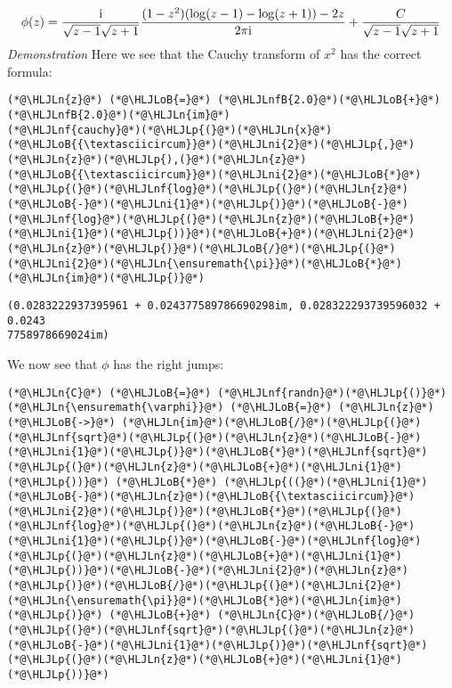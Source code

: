 \documentclass[12pt,landscape]{article}
\newcommand{\HLJLn}[1]{#1}
\newcommand{\HLJLnf}[1]{\textcolor[RGB]{66,102,213}{#1}}
\newcommand{\HLJLnfB}[1]{\textcolor[RGB]{59,151,46}{#1}}
\newcommand{\HLJLni}[1]{\textcolor[RGB]{59,151,46}{#1}}
\newcommand{\HLJLoB}[1]{\textcolor[RGB]{102,102,102}{\textbf{#1}}}
\newcommand{\HLJLp}[1]{#1}
\def\I{ {\rm i} }
\begin{document}
{\[
\phi(z) = {\I \over \sqrt{z - 1} \sqrt{z+1}} {(1-z^2)(\log(z-1) - \log(z+1)) - 2 z \over 2 \pi \I}  + {C \over \sqrt{z-1}\sqrt{z+1}}
\]
\emph{Demonstration} Here we see that the Cauchy transform of $x^2$ has the correct formula:


\begin{lstlisting}
(*@\HLJLn{z}@*) (*@\HLJLoB{=}@*) (*@\HLJLnfB{2.0}@*)(*@\HLJLoB{+}@*)(*@\HLJLnfB{2.0}@*)(*@\HLJLn{im}@*)
(*@\HLJLnf{cauchy}@*)(*@\HLJLp{(}@*)(*@\HLJLn{x}@*)(*@\HLJLoB{{\textasciicircum}}@*)(*@\HLJLni{2}@*)(*@\HLJLp{,}@*) (*@\HLJLn{z}@*)(*@\HLJLp{),(}@*)(*@\HLJLn{z}@*)(*@\HLJLoB{{\textasciicircum}}@*)(*@\HLJLni{2}@*)(*@\HLJLoB{*}@*)(*@\HLJLp{(}@*)(*@\HLJLnf{log}@*)(*@\HLJLp{(}@*)(*@\HLJLn{z}@*)(*@\HLJLoB{-}@*)(*@\HLJLni{1}@*)(*@\HLJLp{)}@*)(*@\HLJLoB{-}@*)(*@\HLJLnf{log}@*)(*@\HLJLp{(}@*)(*@\HLJLn{z}@*)(*@\HLJLoB{+}@*)(*@\HLJLni{1}@*)(*@\HLJLp{))}@*)(*@\HLJLoB{+}@*)(*@\HLJLni{2}@*)(*@\HLJLn{z}@*)(*@\HLJLp{)}@*)(*@\HLJLoB{/}@*)(*@\HLJLp{(}@*)(*@\HLJLni{2}@*)(*@\HLJLn{\ensuremath{\pi}}@*)(*@\HLJLoB{*}@*)(*@\HLJLn{im}@*)(*@\HLJLp{)}@*)
\end{lstlisting}

\begin{lstlisting}
(0.0283222937395961 + 0.024377589786690298im, 0.028322293739596032 + 0.0243
7758978669024im)
\end{lstlisting}


We now see that $\phi$ has the right jumps:


\begin{lstlisting}
(*@\HLJLn{C}@*) (*@\HLJLoB{=}@*) (*@\HLJLnf{randn}@*)(*@\HLJLp{()}@*)
(*@\HLJLn{\ensuremath{\varphi}}@*) (*@\HLJLoB{=}@*) (*@\HLJLn{z}@*) (*@\HLJLoB{->}@*) (*@\HLJLn{im}@*)(*@\HLJLoB{/}@*)(*@\HLJLp{(}@*)(*@\HLJLnf{sqrt}@*)(*@\HLJLp{(}@*)(*@\HLJLn{z}@*)(*@\HLJLoB{-}@*)(*@\HLJLni{1}@*)(*@\HLJLp{)}@*)(*@\HLJLoB{*}@*)(*@\HLJLnf{sqrt}@*)(*@\HLJLp{(}@*)(*@\HLJLn{z}@*)(*@\HLJLoB{+}@*)(*@\HLJLni{1}@*)(*@\HLJLp{))}@*) (*@\HLJLoB{*}@*) (*@\HLJLp{((}@*)(*@\HLJLni{1}@*)(*@\HLJLoB{-}@*)(*@\HLJLn{z}@*)(*@\HLJLoB{{\textasciicircum}}@*)(*@\HLJLni{2}@*)(*@\HLJLp{)}@*)(*@\HLJLoB{*}@*)(*@\HLJLp{(}@*)(*@\HLJLnf{log}@*)(*@\HLJLp{(}@*)(*@\HLJLn{z}@*)(*@\HLJLoB{-}@*)(*@\HLJLni{1}@*)(*@\HLJLp{)}@*)(*@\HLJLoB{-}@*)(*@\HLJLnf{log}@*)(*@\HLJLp{(}@*)(*@\HLJLn{z}@*)(*@\HLJLoB{+}@*)(*@\HLJLni{1}@*)(*@\HLJLp{))}@*)(*@\HLJLoB{-}@*)(*@\HLJLni{2}@*)(*@\HLJLn{z}@*)(*@\HLJLp{)}@*)(*@\HLJLoB{/}@*)(*@\HLJLp{(}@*)(*@\HLJLni{2}@*)(*@\HLJLn{\ensuremath{\pi}}@*)(*@\HLJLoB{*}@*)(*@\HLJLn{im}@*)(*@\HLJLp{)}@*) (*@\HLJLoB{+}@*) (*@\HLJLn{C}@*)(*@\HLJLoB{/}@*)(*@\HLJLp{(}@*)(*@\HLJLnf{sqrt}@*)(*@\HLJLp{(}@*)(*@\HLJLn{z}@*)(*@\HLJLoB{-}@*)(*@\HLJLni{1}@*)(*@\HLJLp{)}@*)(*@\HLJLnf{sqrt}@*)(*@\HLJLp{(}@*)(*@\HLJLn{z}@*)(*@\HLJLoB{+}@*)(*@\HLJLni{1}@*)(*@\HLJLp{))}@*)


\end{lstlisting}}
\end{document}
